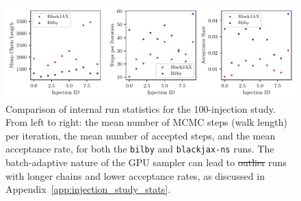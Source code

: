 \documentclass[fleqn,usenatbib]{mnras}
\providecommand{\DIFadd}[1]{{\protect\color{blue}\uwave{#1}}} %
\providecommand{\DIFdel}[1]{{\protect\color{red}\sout{#1}}}                      %
\providecommand{\DIFaddFL}[1]{\DIFadd{#1}} %
\providecommand{\DIFdelFL}[1]{\DIFdel{#1}} %
\providecommand{\DIFaddbeginFL}{} %
\providecommand{\DIFaddendFL}{} %
\providecommand{\DIFdelbeginFL}{} %
\providecommand{\DIFdelendFL}{} %
\newcommand{\DIFscaledelfig}{0.5}
\newlength{\DIFdelgraphicswidth} %
\newlength{\DIFdelgraphicsheight} %
\newcommand{\DIFaddincludegraphics}[2][]{{\color{blue}\fbox{\DIFOincludegraphics[#1]{#2}}}} %
\newcommand{\DIFdelincludegraphics}[2][]{%
\sbox{\DIFdelgraphicsbox}{\DIFOincludegraphics[#1]{#2}}%
\settoboxwidth{\DIFdelgraphicswidth}{\DIFdelgraphicsbox} %
\settoboxtotalheight{\DIFdelgraphicsheight}{\DIFdelgraphicsbox} %
\scalebox{\DIFscaledelfig}{%
\parbox[b]{\DIFdelgraphicswidth}{\usebox{\DIFdelgraphicsbox}\\[-\baselineskip] \rule{\DIFdelgraphicswidth}{0em}}\llap{\resizebox{\DIFdelgraphicswidth}{\DIFdelgraphicsheight}{%
\setlength{\unitlength}{\DIFdelgraphicswidth}%
\begin{picture}(1,1)%
\thicklines\linethickness{2pt} %
{\color[rgb]{1,0,0}\put(0,0){\framebox(1,1){}}}%
{\color[rgb]{1,0,0}\put(0,0){\line( 1,1){1}}}%
{\color[rgb]{1,0,0}\put(0,1){\line(1,-1){1}}}%
\end{picture}%
}\hspace*{3pt}}} %
} %
\DeclareRobustCommand{\DIFaddbeginFL}{\DIFOaddbeginFL \let\includegraphics\DIFaddincludegraphics} %
\DeclareRobustCommand{\DIFaddendFL}{\DIFOaddendFL \let\includegraphics\DIFOincludegraphics} %
\DeclareRobustCommand{\DIFdelbeginFL}{\DIFOdelbeginFL \let\includegraphics\DIFdelincludegraphics} %
\DeclareRobustCommand{\DIFdelendFL}{\DIFOaddendFL \let\includegraphics\DIFOincludegraphics} %
\begin{document}
\begin{figure}
    \centering
    \includegraphics{figures/performance_metrics.pdf}
    \caption{Comparison of internal run statistics for the 100-injection
    study. From left to right: the mean number of MCMC steps (walk length)
    per iteration, the mean number of accepted steps, and the
    mean acceptance rate, for both the \texttt{bilby} and 
    \texttt{blackjax-ns} runs. The batch-adaptive nature of the GPU sampler can \DIFaddbeginFL \DIFaddFL{often
    }\DIFaddendFL lead to \DIFdelbeginFL \DIFdelFL{outlier }\DIFdelendFL runs with longer chains and lower acceptance rates,
    as discussed in Appendix~\ref{app:injection_study_stats}.}
    \label{fig:injection_study_stats}
\end{figure}

\end{document}
